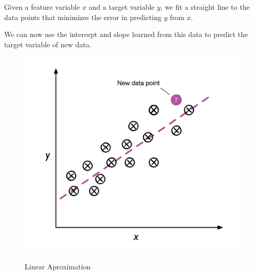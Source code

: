 \documentclass[12pt]{report}
\theoremstyle{largebreak}
\begin{document}
    Given a feature variable $x$ and a target variable $y$, we fit a straight line to the data points that minimizes the error in predicting $y$ from $x$.

    We can now use the intercept and slope learned from this data to predict the target variable of new data.

    \begin{figure}[h]
        \begin{minipage}{\textwidth}
            \centering
            \includegraphics[scale=1]{images/linear_aproximation.png} \\
            \caption{Linear Aproximation}
            \label{figure:linear_aproximation}
        \end{minipage}
    \end{figure}

    
    
\end{document}
